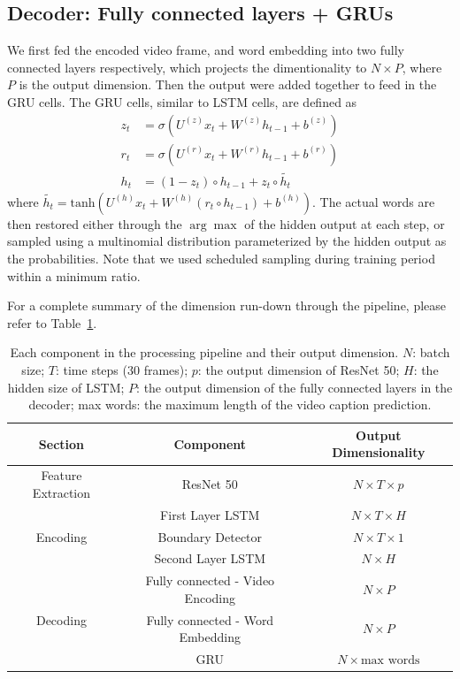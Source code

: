 \documentclass[11pt,a4paper]{article}
\begin{document}
\subsection{Decoder: Fully connected layers + GRUs}
We first fed the encoded video frame, and word embedding into two fully connected layers respectively, which projects the dimentionality to $N \times P$, where $P$ is the output dimension. Then the output were added together to feed in the GRU cells. The GRU cells, similar to LSTM cells, are defined as 
\begin{align*}
    z_t &= \sigma(U^{(z)}x_t + W^{(z)}h_{t-1} + b^{(z)}) \\
    r_t &= \sigma(U^{(r)}x_t + W^{(r)}h_{t-1} + b^{(r)}) \\ 
    h_t &= (1 - z_t) \circ h_{t-1} + z_t \circ \tilde{h_t}
\end{align*}
where $\tilde{h_t} = \text{tanh}(U^{(h)}x_t + W^{(h)}(r_t \circ h_{t-1}) + b^{(h)})$. The actual words are then restored either through the $\arg\max$ of the hidden output at each step, or sampled using a multinomial distribution parameterized by the hidden output as the probabilities. Note that we used scheduled sampling \cite{Bengio:2015:SSS:2969239.2969370} during training period within a minimum ratio. 

For a complete summary of the dimension run-down through the pipeline, please refer to Table~\ref{tab:dim}.

\begin{table}[t!]
\centering
\begin{tabular}{c|c|c}
\hline \textbf{Section} & \textbf{Component} & \textbf{Output Dimensionality} \\ \hline\hline
Feature Extraction & ResNet 50 & $N \times T \times p$ \\ \hline
\multirow{3}{*}{Encoding} & First Layer LSTM & $N \times T \times H$ \\
& Boundary Detector & $N \times T \times 1$ \\
& Second Layer LSTM & $N \times H$ \\ \hline
\multirow{3}{*}{Decoding} & Fully connected - Video Encoding & $ N \times P$ \\
& Fully connected - Word Embedding & $ N \times P$ \\
& GRU & $N \times \text{max words} $ \\
\hline
\end{tabular}
\caption{Each component in the processing pipeline and their output dimension. $N$: batch size; $T$: time steps (30 frames); $p$: the output dimension of ResNet 50; $H$: the hidden size of LSTM; $P$: the output dimension of the fully connected layers in the decoder; max words: the maximum length of the video caption prediction.}
\label{tab:dim}
\end{table}
\end{document}
